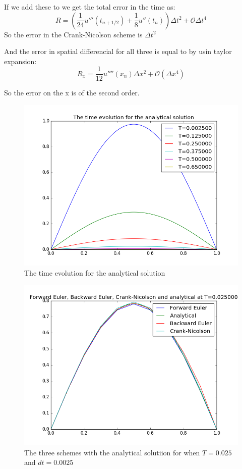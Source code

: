 \documentclass[a4paper,10pt]{article}
\begin{document}
If we add these to we get the total error in the time as:
\begin{equation}
 R = (\frac{1}{24} u'''(t_{n+1/2}) + \frac{1}{8}u''(t_n)) \Delta t^2 + \mathcal{O}\Delta t^4 
\end{equation}
So the error in the Crank-Nicolson scheme is $\Delta t^2$

And the error in spatial differencial for all three is equal to by usin taylor expansion:
\begin{equation}
 R_x = \frac{1}{12}u''''(x_n) \Delta x^2 + \mathcal{O}(\Delta x^4)
\end{equation}

So the error on the x is of the second order.



\begin{figure}
  \includegraphics[scale=0.5]{Time_evolution}
    \caption{The time evolution for the analytical solution}
    \label{fig:time_evo}
\end{figure}

\begin{figure}
  \includegraphics[scale=0.5]{numerical_analytcal_T0025}
    \caption{The three schemes with the analytical solutiion for when $T = 0.025$ and $dt = 0.0025$}
    \label{fig:NumAna0025}
\end{figure}
\end{document}
